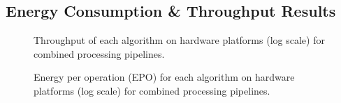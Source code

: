 




\subsection{Energy Consumption \& Throughput Results}





\begin{figure}[tb]
    \centering
\resizebox{\columnwidth}{!}{}    %
    \caption[ Combined Algorithms Throughput]{{Throughput of each algorithm on hardware platforms (log scale) for combined processing pipelines.}}
    \label{fig:CombinedThroughput}
\end{figure}

\begin{figure}[tb]
    \centering
\resizebox{\columnwidth}{!}{}    %
    \caption[Combined Algorithm EPO]{{Energy per operation (EPO) for each algorithm on hardware platforms (log scale) for combined processing pipelines.}}
    \label{fig:CombinedEPO}
\end{figure}



